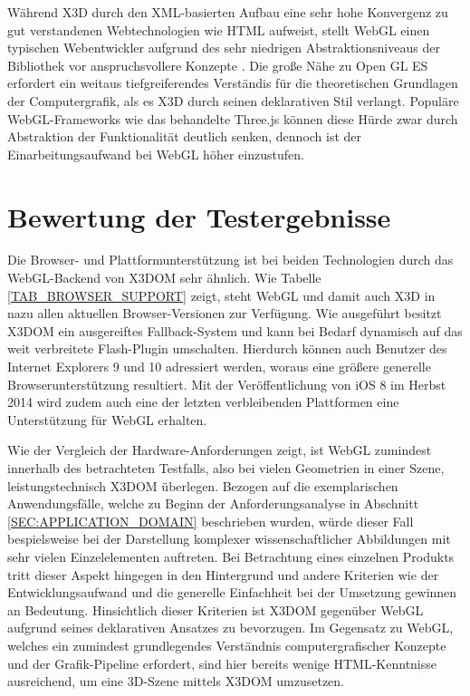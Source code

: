 Während X3D durch den XML-basierten Aufbau eine sehr hohe Konvergenz zu gut verstandenen Webtechnologien wie HTML aufweist, stellt WebGL einen typischen Webentwickler aufgrund des sehr niedrigen Abstraktionsniveaus der Bibliothek vor anspruchsvollere Konzepte \autocite{Jankowski:2013:DII:2466533.2466547}. Die große Nähe zu Open GL ES erfordert ein weitaus tiefgreiferendes Verständis für die theoretischen Grundlagen der Computergrafik, als es X3D durch seinen deklarativen Stil verlangt. Populäre WebGL-Frameworks wie das behandelte Three.js können diese Hürde zwar durch Abstraktion der Funktionalität deutlich senken, dennoch ist der Einarbeitungsaufwand bei WebGL höher einzustufen.

\section{Bewertung der Testergebnisse}

Die Browser- und Plattformunterstützung ist bei beiden Technologien durch das WebGL-Backend von X3DOM sehr ähnlich. Wie Tabelle \ref{TAB_BROWSER_SUPPORT} zeigt, steht WebGL und damit auch X3D in nazu allen aktuellen Browser-Versionen zur Verfügung. Wie ausgeführt besitzt X3DOM ein ausgereiftes Fallback-System und kann bei Bedarf dynamisch auf das weit verbreitete Flash-Plugin umschalten. Hierdurch können auch Benutzer des Internet Explorers 9 und 10 adressiert werden, woraus eine größere generelle Browserunterstützung resultiert. Mit der Veröffentlichung von iOS 8 im Herbst 2014 wird zudem auch eine der letzten verbleibenden Plattformen eine Unterstützung für WebGL erhalten.

Wie der Vergleich der Hardware-Anforderungen zeigt, ist WebGL zumindest innerhalb des betrachteten Testfalls, also bei vielen Geometrien in einer Szene, leistungstechnisch X3DOM überlegen. Bezogen auf die exemplarischen Anwendungsfälle, welche zu Beginn der Anforderungsanalyse in Abschnitt \ref{SEC:APPLICATION_DOMAIN} beschrieben wurden, würde dieser Fall bespielsweise bei der Darstellung komplexer wissenschaftlicher Abbildungen mit sehr vielen Einzelelementen auftreten. Bei Betrachtung eines einzelnen Produkts tritt dieser Aspekt hingegen in den Hintergrund und andere Kriterien wie der Entwicklungsaufwand und die generelle Einfachheit bei der Umsetzung gewinnen an Bedeutung. Hinsichtlich dieser Kriterien ist X3DOM gegenüber WebGL aufgrund seines deklarativen Ansatzes zu bevorzugen. Im Gegensatz zu WebGL, welches ein zumindest grundlegendes Verständnis computergrafischer Konzepte und der Grafik-Pipeline erfordert, sind hier bereits wenige HTML-Kenntnisse ausreichend, um eine 3D-Szene mittels X3DOM umzusetzen.

